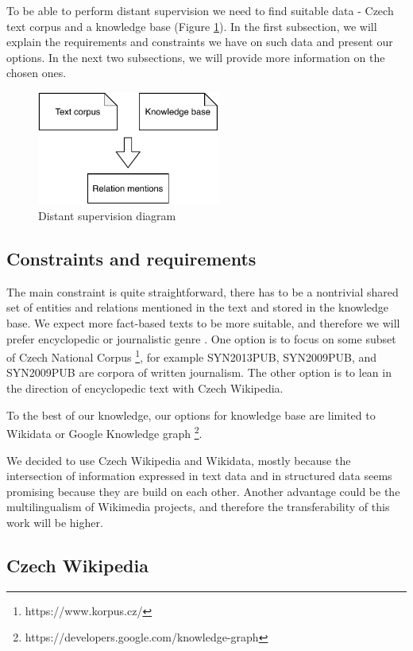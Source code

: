 To be able to perform distant supervision we need to find suitable data - Czech text corpus and a knowledge base (Figure \ref{obr03:DSD}). In the first subsection, we will explain the requirements and constraints we have on such data and present our options. In the next two subsections, we will provide more information on the chosen ones.

\begin{figure}[h]\centering
\includegraphics[width=60mm]{./img//Diplomka diagramy-Distant supervision}
\caption{Distant supervision diagram}
\label{obr03:DSD}
\end{figure}

\subsection{Constraints and requirements}
The main constraint is quite straightforward, there has to be a nontrivial shared set of entities and relations mentioned in the text and stored in the knowledge base. We expect more fact-based texts to be more suitable, and therefore we will prefer encyclopedic or journalistic genre . One option is to focus on some subset of Czech National Corpus \footnote{https://www.korpus.cz/}, for example SYN2013PUB, SYN2009PUB, and SYN2009PUB are corpora of written journalism. The other option is to lean in the direction of encyclopedic text with Czech Wikipedia.

To the best of our knowledge, our options for knowledge base are limited to Wikidata or Google Knowledge graph \footnote{https://developers.google.com/knowledge-graph}.

We decided to use Czech Wikipedia and Wikidata, mostly because the intersection of information expressed in text data and in structured data seems promising because they are build on each other. Another advantage could be the multilingualism of Wikimedia projects, and therefore the transferability of this work will be higher. 


\subsection{Czech Wikipedia}

